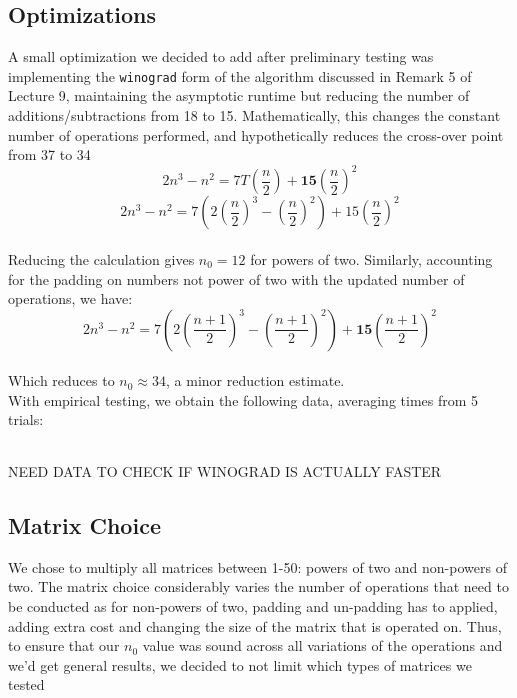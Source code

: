 \documentclass[11pt]{scrartcl}
\theoremstyle{dotlessP}
\theoremstyle{dotlessN}
\theoremstyle{dotN}
\begin{document}
\subsection{Optimizations}
A small optimization we decided to add after preliminary testing was implementing the \texttt{winograd} form of the algorithm discussed in Remark 5 of Lecture 9, maintaining the asymptotic runtime but reducing the number of additions/subtractions from 18 to 15. Mathematically, this changes the constant number of operations performed, and hypothetically reduces the cross-over point from 37 to 34\
\[2n^3 - n^2 = 7T(\frac{n}{2})+\textbf{15}(\frac{n}{2})^2\]
\[2n^3-n^2 = 7(2(\frac{n}{2})^3-(\frac{n}{2})^2)+15(\frac{n}{2})^2\]\\

Reducing the calculation gives $n_0 = 12$ for powers of two. 
Similarly, accounting for the padding on numbers not power of two with the updated number of operations, we have: 
\[2n^3 - n^2 = 7(2(\frac{n+1}{2})^3-(\frac{n+1}{2})^2)+\textbf{15}(\frac{n+1}{2})^2\]\\

Which reduces to $n_0 \approx 34$, a minor reduction estimate.\\

With empirical testing, we obtain the following data, averaging times from 5 trials:
\begin{figure}[H]
\centering
\begin{tabular}{c|c|c}
\end{tabular}
\end{figure}
NEED DATA TO CHECK IF WINOGRAD IS ACTUALLY FASTER 

\subsection{Matrix Choice}
We chose to multiply all matrices between 1-50: powers of two and non-powers of two. The matrix choice considerably varies the number of operations that need to be conducted as for non-powers of two, padding and un-padding has to applied, adding extra cost and changing the size of the matrix that is operated on. Thus, to ensure that our $n_0$ value was sound across all variations of the operations and we'd get general results, we decided to not limit which types of matrices we tested \\ 
\end{document}
